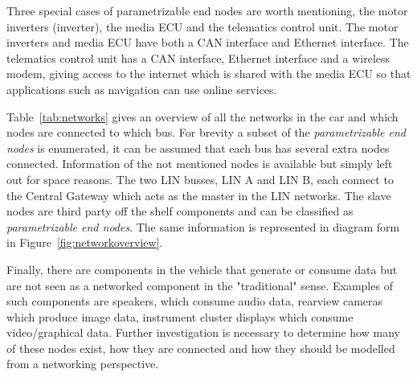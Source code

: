 Three special cases of parametrizable end nodes are worth mentioning, the motor inverters (inverter), the media ECU and the telematics control unit. The motor inverters and media ECU have both a CAN interface and Ethernet interface. The telematics control unit has a CAN interface, Ethernet interface and a wireless modem, giving access to the internet which is shared with the media ECU so that applications such as navigation can use online services.

Table~\ref{tab:networks} gives an overview of all the networks in the car and which nodes are connected to which bus. For brevity a subset of the \textit{parametrizable end nodes} is enumerated, it can be assumed that each bus has several extra nodes connected. Information of the not mentioned nodes is available but simply left out for space reasons. The two LIN busses, LIN A and LIN B, each connect to the Central Gateway which acts as the master in the LIN networks. The slave nodes are third party off the shelf components and can be classified as \textit{parametrizable end nodes}. The same information is represented in diagram form in Figure~\ref{fig:networkoverview}.

Finally, there are components in the vehicle that generate or consume data but are not seen as a networked component in the "traditional" sense. Examples of such components are speakers, which consume audio data, rearview cameras which produce image data, instrument cluster displays which consume video/graphical data. Further investigation is necessary to determine how many of these nodes exist, how they are connected and how they should be modelled from a networking perspective.

